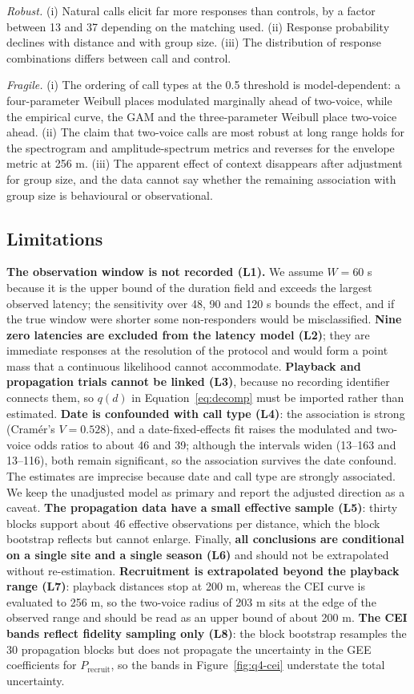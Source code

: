 \emph{Robust.} (i) Natural calls elicit far more responses than controls, by a factor between 13
and 37 depending on the matching used. (ii) Response probability declines with distance and with
group size. (iii) The distribution of response combinations differs between call and control.

\emph{Fragile.} (i) The ordering of call types at the 0.5 threshold is model-dependent: a
four-parameter Weibull places modulated marginally ahead of two-voice, while the empirical curve,
the GAM and the three-parameter Weibull place two-voice ahead. (ii) The claim that two-voice
calls are most robust at long range holds for the spectrogram and amplitude-spectrum metrics and
reverses for the envelope metric at 256 m. (iii) The apparent effect of context disappears after
adjustment for group size, and the data cannot say whether the remaining association with group
size is behavioural or observational.

\subsection{Limitations}

\textbf{The observation window is not recorded (L1).} We assume $W=60$ s because it is the upper
bound of the duration field and exceeds the largest observed latency; the sensitivity over 48,
90 and 120 s bounds the effect, and if the true window were shorter some non-responders would be
misclassified. \textbf{Nine zero latencies are excluded from the latency model (L2)}; they are
immediate responses at the resolution of the protocol and would form a point mass that a
continuous likelihood cannot accommodate. \textbf{Playback and propagation trials cannot be
linked (L3)}, because no recording identifier connects them, so $q(d)$ in
Equation~\eqref{eq:decomp} must be imported rather than estimated. \textbf{Date is confounded
with call type (L4)}: the association is strong (Cram\'er's $V=0.528$), and a date-fixed-effects
fit raises the modulated and two-voice odds ratios to about 46 and 39; although the intervals
widen (13--163 and 13--116), both remain significant, so the association survives the date
confound. The estimates are imprecise because date and call type are strongly associated. We keep
the unadjusted model as primary and report the adjusted direction as a caveat. \textbf{The propagation data have a small effective sample (L5)}: thirty
blocks support about 46 effective observations per distance, which the block bootstrap reflects
but cannot enlarge. Finally, \textbf{all conclusions are conditional on a single site and a
single season (L6)} and should not be extrapolated without re-estimation.
\textbf{Recruitment is extrapolated beyond the playback range (L7)}: playback distances stop at
200 m, whereas the CEI curve is evaluated to 256 m, so the two-voice radius of 203 m sits at the
edge of the observed range and should be read as an upper bound of about 200 m. \textbf{The CEI
bands reflect fidelity sampling only (L8)}: the block bootstrap resamples the 30 propagation
blocks but does not propagate the uncertainty in the GEE coefficients for $P_{\mathrm{recruit}}$,
so the bands in Figure~\ref{fig:q4-cei} understate the total uncertainty.

